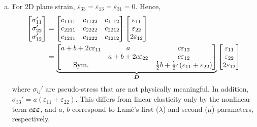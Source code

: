 \begin{enumerate}[(a)]
{}
\item {
For 2D plane strain, $\varepsilon_{33}=\varepsilon_{13}=\varepsilon_{31}=0$.
Hence, 
\begin{equation}\label{eqn:midterm_D}
\begin{aligned}
    \begin{bmatrix}
        \sigma_{11}' \\ \sigma_{22}' \\ \sigma_{12}'
    \end{bmatrix} &= \begin{bmatrix}
        c_{1111} & c_{1122} & c_{1112} \\
        c_{2211} & c_{2222} & c_{2212} \\
        c_{1211} & c_{1222} & c_{1212}
    \end{bmatrix} \begin{bmatrix}
        \varepsilon_{11} \\ \varepsilon_{22} \\ 2\varepsilon_{12}
    \end{bmatrix} \\ 
    &= \underbrace{\begin{bmatrix}
        a + b + 2c\varepsilon_{11}  & a & c \varepsilon_{12} \\
         & a + b + 2c\varepsilon_{22} & c \varepsilon_{12}  \\
        \textrm{Sym.} &  & \frac{1}{2}b + \frac{1}{2}c(\varepsilon_{11} + \varepsilon_{22})
    \end{bmatrix}}_{\bm{D}} \begin{bmatrix}
        \varepsilon_{11} \\ \varepsilon_{22} \\ 2\varepsilon_{12}
    \end{bmatrix}
\end{aligned}
\end{equation}
where $\sigma_{ij}'$ are pseudo-stress that are not physically meaningful.
In addition, $\sigma_{33}' = a(\varepsilon_{11} + \varepsilon_{22})$.
This differs from linear elasticity only by the nonlinear term $c \bm{\varepsilon} \bm{\varepsilon}$, and $a$, $b$ correspond to Lam\'{e}'s first ($\lambda$) and second ($\mu$) parameters, respectively. 
}
\end{enumerate}

